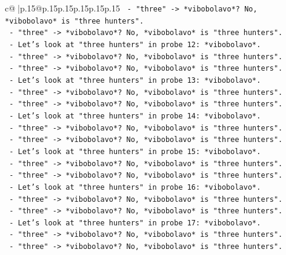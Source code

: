 \documentclass{article}
\begin{document}
{\begin{supertabular}{c@{$\;$}|p{.15\linewidth}@{}p{.15\linewidth}p{.15\linewidth}p{.15\linewidth}p{.15\linewidth}p{.15\linewidth}}
{{{\texttt{                  {-} "three" {-}> *vibobolavo*? No, *vibobolavo* is "three hunters".} \\
\texttt{                  {-} "three" {-}> *vibobolavo*? No, *vibobolavo* is "three hunters".} \\
\texttt{                  {-} Let's look at "three hunters" in probe 12: *vibobolavo*.} \\
\texttt{                  {-} "three" {-}> *vibobolavo*? No, *vibobolavo* is "three hunters".} \\
\texttt{                  {-} "three" {-}> *vibobolavo*? No, *vibobolavo* is "three hunters".} \\
\texttt{                  {-} Let's look at "three hunters" in probe 13: *vibobolavo*.} \\
\texttt{                  {-} "three" {-}> *vibobolavo*? No, *vibobolavo* is "three hunters".} \\
\texttt{                  {-} "three" {-}> *vibobolavo*? No, *vibobolavo* is "three hunters".} \\
\texttt{                  {-} Let's look at "three hunters" in probe 14: *vibobolavo*.} \\
\texttt{                  {-} "three" {-}> *vibobolavo*? No, *vibobolavo* is "three hunters".} \\
\texttt{                  {-} "three" {-}> *vibobolavo*? No, *vibobolavo* is "three hunters".} \\
\texttt{                  {-} Let's look at "three hunters" in probe 15: *vibobolavo*.} \\
\texttt{                  {-} "three" {-}> *vibobolavo*? No, *vibobolavo* is "three hunters".} \\
\texttt{                  {-} "three" {-}> *vibobolavo*? No, *vibobolavo* is "three hunters".} \\
\texttt{                  {-} Let's look at "three hunters" in probe 16: *vibobolavo*.} \\
\texttt{                  {-} "three" {-}> *vibobolavo*? No, *vibobolavo* is "three hunters".} \\
\texttt{                  {-} "three" {-}> *vibobolavo*? No, *vibobolavo* is "three hunters".} \\
\texttt{                  {-} Let's look at "three hunters" in probe 17: *vibobolavo*.} \\
\texttt{                  {-} "three" {-}> *vibobolavo*? No, *vibobolavo* is "three hunters".} \\
\texttt{                  {-} "three" {-}> *vibobolavo*? No, *vibobolavo* is "three hunters".} \\
}}}
\end{supertabular}}
\end{document}
